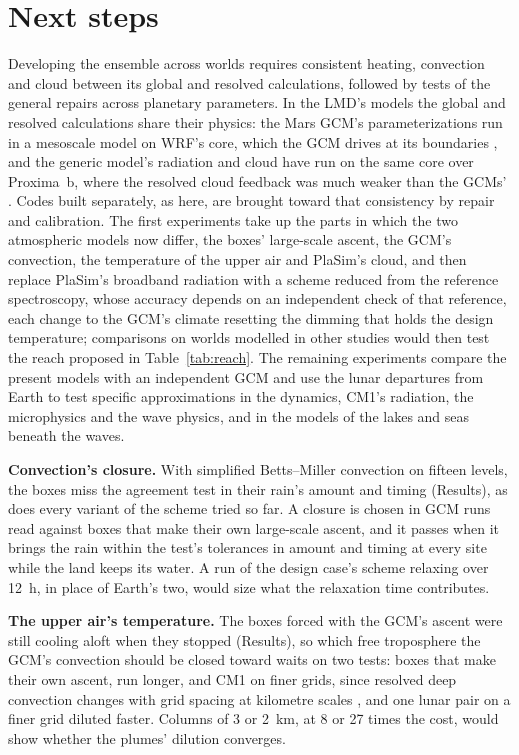 \section{Next steps}

Developing the ensemble across worlds requires consistent heating, convection and cloud between its global and
resolved calculations, followed by tests of the general repairs across planetary parameters. In the LMD's models the
global and resolved calculations share their physics: the Mars GCM's parameterizations run in a mesoscale model on
WRF's core, which the GCM drives at its boundaries \autocite{spiga2009new}, and the generic model's radiation and
cloud have run on the same core over Proxima~b, where the resolved cloud feedback was much weaker than the GCMs'
\autocite{lefevre2021convection}. Codes built separately, as here, are brought toward that consistency by repair and
calibration. The first experiments take up the parts in which the two atmospheric models now differ, the boxes' large-scale
ascent, the GCM's convection, the temperature of the upper air and PlaSim's cloud, and then replace PlaSim's
broadband radiation with a scheme reduced from the reference spectroscopy, whose accuracy depends on an independent
check of that reference, each change to the GCM's climate resetting the dimming that holds the design temperature;
comparisons on worlds modelled in other studies would then test the reach proposed in Table~\ref{tab:reach}. The
remaining experiments compare the present models with an independent GCM and use the lunar departures from Earth to
test specific approximations in the dynamics, CM1's radiation, the microphysics and the wave physics, and in the
models of the lakes and seas beneath the waves.

\textbf{Convection's closure.} With simplified Betts--Miller convection on fifteen levels, the boxes miss the
agreement test in their rain's amount and timing (Results), as does every variant of the scheme tried so far. A
closure is chosen in GCM runs read against boxes that make their own large-scale ascent, and it passes when it
brings the rain within the test's tolerances in amount and timing at every site while the land keeps its
water. A run of the design case's scheme relaxing over 12~h, in place of Earth's two, would size what
the relaxation time contributes.

\textbf{The upper air's temperature.} The boxes forced with the GCM's ascent were still cooling aloft when they
stopped (Results), so which free troposphere the GCM's convection should be closed toward waits on two tests: boxes
that make their own ascent, run longer, and CM1 on finer grids, since resolved deep convection changes with grid
spacing at kilometre scales \autocite{bryan2003resolution}, and one lunar pair on a finer grid diluted faster.
Columns of 3 or 2~km, at 8 or 27 times the cost, would show whether the plumes' dilution converges.

